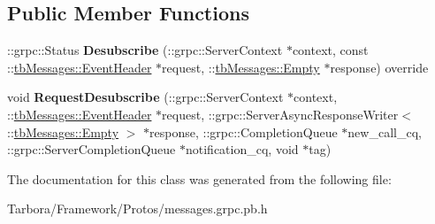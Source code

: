 \subsection*{Public Member Functions}
\begin{DoxyCompactItemize}
\item 
\mbox{\label{classtbMessages_1_1TarboraMessages_1_1WithAsyncMethod__Desubscribe_a9c62003756faa1fbc9cc19c444071f8a}} 
\+::grpc\+::\+Status {\bfseries Desubscribe} (\+::grpc\+::\+Server\+Context $\ast$context, const \+::\hyperlink{classtbMessages_1_1EventHeader}{tb\+Messages\+::\+Event\+Header} $\ast$request, \+::\hyperlink{classtbMessages_1_1Empty}{tb\+Messages\+::\+Empty} $\ast$response) override
\item 
\mbox{\label{classtbMessages_1_1TarboraMessages_1_1WithAsyncMethod__Desubscribe_ab457759e8113d9afa486b07a1d98dc93}} 
void {\bfseries Request\+Desubscribe} (\+::grpc\+::\+Server\+Context $\ast$context, \+::\hyperlink{classtbMessages_1_1EventHeader}{tb\+Messages\+::\+Event\+Header} $\ast$request, \+::grpc\+::\+Server\+Async\+Response\+Writer$<$ \+::\hyperlink{classtbMessages_1_1Empty}{tb\+Messages\+::\+Empty} $>$ $\ast$response, \+::grpc\+::\+Completion\+Queue $\ast$new\+\_\+call\+\_\+cq, \+::grpc\+::\+Server\+Completion\+Queue $\ast$notification\+\_\+cq, void $\ast$tag)
\end{DoxyCompactItemize}


The documentation for this class was generated from the following file\+:\begin{DoxyCompactItemize}
\item 
Tarbora/\+Framework/\+Protos/messages.\+grpc.\+pb.\+h\end{DoxyCompactItemize}
